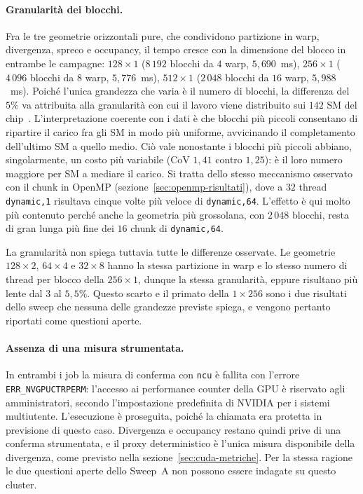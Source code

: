 \paragraph{Granularità dei blocchi.}
Fra le tre geometrie orizzontali pure, che condividono partizione in warp,
divergenza, spreco e occupancy, il tempo cresce con la dimensione del blocco in
entrambe le campagne: $128{\times}1$ ($8\,192$ blocchi da $4$ warp,
$5{,}690$~ms), $256{\times}1$ ($4\,096$ blocchi da $8$ warp, $5{,}776$~ms),
$512{\times}1$ ($2\,048$ blocchi da $16$ warp, $5{,}988$~ms). Poiché l'unica
grandezza che varia è il numero di blocchi, la differenza del $5\%$ va attribuita
alla granularità con cui il lavoro viene distribuito sui $142$ SM del
chip~\cite{nvidia_ada_arch}.
L'interpretazione coerente con i dati è che blocchi più piccoli consentano di
ripartire il carico fra gli SM in modo più uniforme, avvicinando il completamento
dell'ultimo SM a quello medio. Ciò vale nonostante i blocchi più piccoli abbiano,
singolarmente, un costo più variabile (CoV $1{,}41$ contro $1{,}25$): è il loro
numero maggiore per SM a mediare il carico. Si tratta dello stesso meccanismo osservato con il
chunk in OpenMP (sezione~\ref{sec:openmp-risultati}), dove a $32$ thread
\texttt{dynamic,1} risultava cinque volte più veloce di \texttt{dynamic,64}.
L'effetto è qui molto più contenuto perché anche la geometria più grossolana, con
$2\,048$ blocchi, resta di gran lunga più fine dei $16$ chunk di
\texttt{dynamic,64}.

La granularità non spiega tuttavia tutte le differenze osservate. Le geometrie
$128{\times}2$, $64{\times}4$ e $32{\times}8$ hanno la stessa partizione in warp e
lo stesso numero di thread per blocco della $256{\times}1$, dunque la stessa
granularità, eppure risultano più lente dal $3$ al $5{,}5\%$. Questo scarto e il
primato della $1{\times}256$ sono i due risultati dello sweep che nessuna delle
grandezze previste spiega, e vengono pertanto riportati come questioni aperte.

\paragraph{Assenza di una misura strumentata.}
In entrambi i job la misura di conferma con \texttt{ncu} è fallita con l'errore
\texttt{ERR\_NVGPUCTRPERM}: l'accesso ai performance counter della GPU è riservato
agli amministratori, secondo l'impostazione predefinita di NVIDIA per i sistemi
multiutente. L'esecuzione è proseguita, poiché la chiamata era protetta in
previsione di questo caso. Divergenza e occupancy restano quindi prive di una
conferma strumentata, e il proxy deterministico è l'unica misura disponibile della
divergenza, come previsto nella sezione~\ref{sec:cuda-metriche}. Per la stessa
ragione le due questioni aperte dello Sweep~A non possono essere indagate su
questo cluster.

